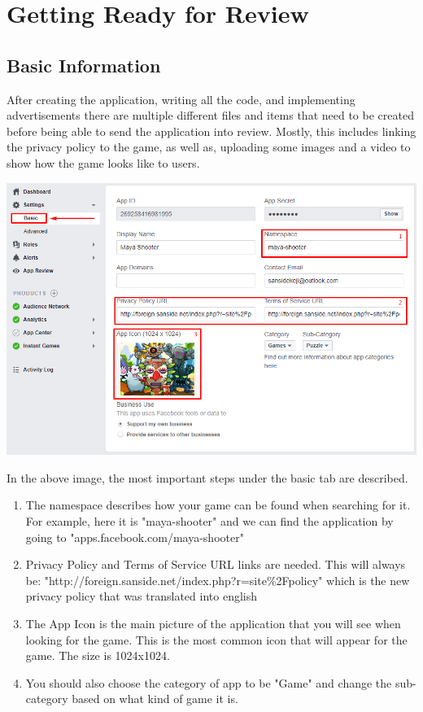 \documentclass{article}
\begin{document}
\section{Getting Ready for Review}
\subsection{Basic Information}
After creating the application, writing all the code, and implementing advertisements there are multiple different files and items that need to be created before being able to send the application into review. Mostly, this includes linking the privacy policy to the game, as well as, uploading some images and a video to show how the game looks like to users.

\begin{center}
\includegraphics[width=\textwidth]{images/basicinfo.png}
\end{center}

In the above image, the most important steps under the basic tab are described. 
\begin{enumerate}
\item The namespace describes how your game can be found when searching for it. For example, here it is "maya-shooter" and we can find the application by going to "apps.facebook.com/maya-shooter"
\item Privacy Policy and Terms of Service URL links are needed. This will always be: "http://foreign.sanside.net/index.php?r=site\%2Fpolicy" which is the new privacy policy that was translated into english
\item The App Icon is the main picture of the application that you will see when looking for the game. This is the most common icon that will appear for the game. The size is 1024x1024.
\item You should also choose the category of app to be "Game" and change the sub-category based on what kind of game it is.
\end{enumerate}
\end{document}
